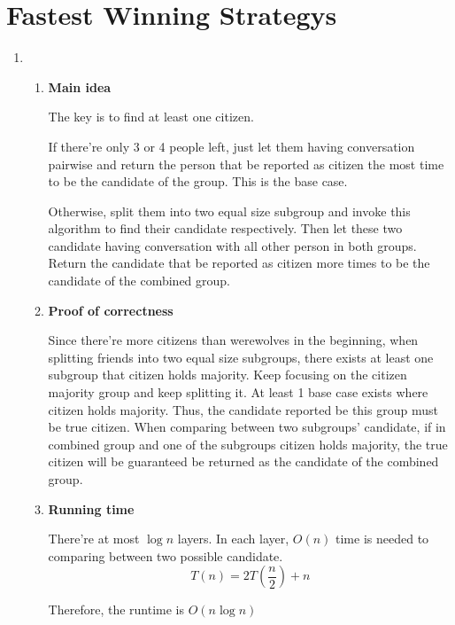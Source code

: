 \documentclass[11pt]{article}
\begin{document}
  \section{Fastest Winning Strategys}
\renewcommand{\labelenumi}{(\alph{enumi})}
\begin{enumerate}

\item 

\renewcommand{\theenumii}{\roman{enumii}}
	\begin{enumerate}
		\item \textbf{Main idea}
		
		The key is to find at least one citizen. 
		
		If there're only 3 or 4 people left, just let them having conversation pairwise and return the person that be reported as citizen the most time to be the candidate of the group. This is the base case. 
		
		Otherwise, split them into two equal size subgroup and invoke this algorithm to find their candidate respectively. Then let these two candidate having conversation with all other person in both groups. Return the candidate that be reported as citizen more times to be the candidate of the combined group. 
		
		
		\item \textbf{Proof of correctness}
		
		Since there're more citizens than werewolves in the beginning, when splitting friends into two equal size subgroups, there exists at least one subgroup that citizen holds majority. Keep focusing on the citizen majority group and keep splitting it. At least 1 base case exists where citizen holds majority. Thus, the candidate reported be this group must be true citizen. When comparing between two subgroups' candidate, if in combined group and one of the subgroups citizen holds majority, the true citizen will be guaranteed be returned as the candidate of the combined group.
		
		\item \textbf{Running time}
		
		There're at most $\log n$ layers. In each layer, $O(n)$ time is needed to comparing between two possible candidate. 
		\[
			T(n) = 2T(\frac{n}{2}) + n
		\]
		
		Therefore, the runtime is $O(n\log n)$
		
	\end{enumerate}





\end{enumerate}
\end{document}
